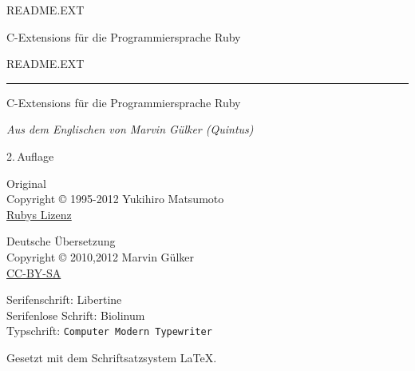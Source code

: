 \begin{titlepage}\sffamily
  \begingroup\Large README.EXT\endgroup\par
  C-Extensions für die Programmiersprache Ruby
\end{titlepage}


\begin{titlepage}\centering
  \begingroup\Huge{README.EXT}\endgroup\\
  \rule{\textwidth}{2pt}

  \vspace{\baselineskip}

  \noindent\begingroup\LARGE C-Extensions für die Programmiersprache Ruby\endgroup

  \vspace{0.5\baselineskip}

  \noindent\textit{Aus dem Englischen von Marvin Gülker (Quintus)}

  \vspace{\baselineskip}

  \begingroup\footnotesize
  2.\,Auflage \monthname~\the\year
  \endgroup

  \vspace{\baselineskip}

  \vfill

  \begin{minipage}{0.45\linewidth}\raggedright\footnotesize
    Original\\
    Copyright © 1995-2012 Yukihiro Matsumoto\\
    \href{http://www.ruby-lang.org/de/about/license.txt}{Rubys Lizenz}
  \end{minipage}
  \hfill
  \begin{minipage}{0.45\linewidth}\raggedleft\footnotesize
    Deutsche Übersetzung\\
    Copyright © 2010,2012 Marvin Gülker\\
    \href{http://creativecommons.org/licenses/by-sa/3.0/de/}{CC-BY-SA}
  \end{minipage}

  \newpage\thispagestyle{empty}

  \begin{flushleft}
    \vspace*{\fill}
    \noindent Serifenschrift: Libertine\\
    Serifenlose Schrift: \textsf{Biolinum}\\
    Typschrift: \texttt{Computer Modern Typewriter}

    \vspace{\baselineskip}

    \noindent Gesetzt mit dem Schriftsatzsystem \LaTeX.
  \end{flushleft}
\end{titlepage}

